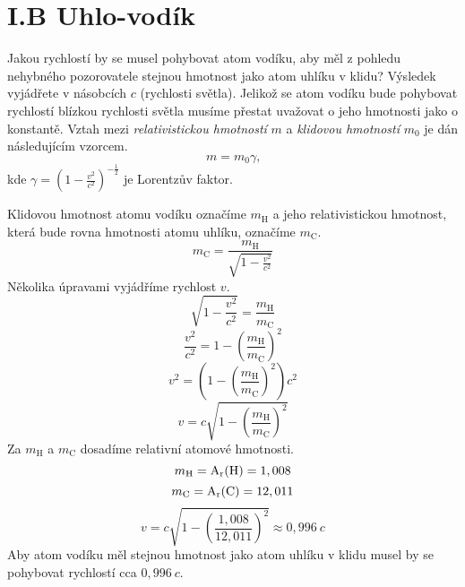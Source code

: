 \documentclass{../../../../style/mkimain}
\begin{document}
\section*{I.B Uhlo-vodík}
\noindent Jakou rychlostí by se musel pohybovat atom vodíku, aby měl z pohledu nehybného pozorovatele stejnou hmotnost jako atom uhlíku v klidu? 
Výsledek vyjádřete v násobcích $c$ (rychlosti světla).
\klein
Jelikož se atom vodíku bude pohybovat rychlostí blízkou rychlosti světla musíme přestat 
uvažovat o jeho hmotnosti jako o konstantě. Vztah mezi \emph{relativistickou hmotností} $m$ 
a \emph{klidovou hmotností} $m_0$ je dán následujícím vzorcem.
$$
m=m_0\gamma\text{,}
$$
kde $\gamma=\left(1-\frac{v^2}{c^2}\right)^{-\frac{1}{2}}$ je Lorentzův faktor.

Klidovou hmotnost atomu vodíku označíme $m_\mathrm{H}$ a jeho relativistickou hmotnost, která 
bude rovna hmotnosti atomu uhlíku, označíme $m_\mathrm{C}$. 
$$
m_\mathrm{C}=\frac{m_\mathrm{H}}{\sqrt{1-\frac{v^2}{c^2}}}
$$
Několika úpravami vyjádříme rychlost $v$.
$$
\sqrt{1-\frac{v^2}{c^2}}=\frac{m_\mathrm{H}}{m_\mathrm{C}}
$$
$$
\frac{v^2}{c^2}=1-\left(\frac{m_\mathrm{H}}{m_\mathrm{C}}\right)^2
$$
$$
v^2=\left(1-\left(\frac{m_\mathrm{H}}{m_\mathrm{C}}\right)^2\right)c^2
$$
$$
v=c\sqrt{1-\left(\frac{m_\mathrm{H}}{m_\mathrm{C}}\right)^2}
$$
Za $m_\mathrm{H}$ a $m_\mathrm{C}$ dosadíme relativní atomové hmotnosti.
$$
m_\mathrm{H}=\mathrm{A_r(\ce{H})}=1,008
$$
$$
m_\mathrm{C}=\mathrm{A_r(\ce{C})}=12,011
$$
$$
v=c\sqrt{1-\left(\frac
{1,008}{12,011}\right)^2}\approx0,996\ c
$$
Aby atom vodíku měl stejnou hmotnost jako atom uhlíku v klidu musel by se pohybovat rychlostí cca $0,996\ c$.\\
\end{document}
